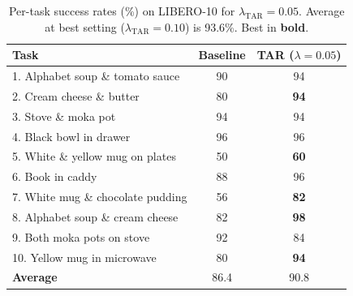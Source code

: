 \begin{table}[t]
\centering
\caption{Per-task success rates (\%) on LIBERO-10 for $\lambda_{\text{TAR}}=0.05$. Average at best setting ($\lambda_{\text{TAR}}=0.10$) is 93.6\%. Best in \textbf{bold}.}
\label{tab:per_task}
\small
\begin{tabular}{lcc}
\toprule
\textbf{Task} & \textbf{Baseline} & \textbf{TAR ($\lambda{=}0.05$)} \\
\midrule
1. Alphabet soup \& tomato sauce & 90 & 94 \\
2. Cream cheese \& butter & 80 & \textbf{94} \\
3. Stove \& moka pot & 94 & 94 \\
4. Black bowl in drawer & 96 & 96 \\
5. White \& yellow mug on plates & 50 & \textbf{60} \\
6. Book in caddy & 88 & 96 \\
7. White mug \& chocolate pudding & 56 & \textbf{82} \\
8. Alphabet soup \& cream cheese & 82 & \textbf{98} \\
9. Both moka pots on stove & 92 & 84 \\
10. Yellow mug in microwave & 80 & \textbf{94} \\
\midrule
\textbf{Average} & 86.4 & 90.8 \\
\bottomrule
\end{tabular}
\end{table}
